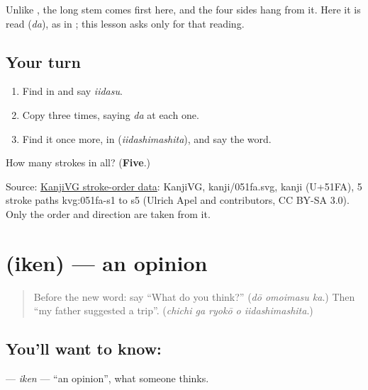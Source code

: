 Unlike \textbf{}, the long stem comes first here, and the four sides hang from it. Here it is read \textbf{} (\emph{da}), as in \textbf{}; this lesson asks only for that reading.

\subsection*{Your turn}
\begin{enumerate}
\raggedright
  \item Find \textbf{} in \textbf{} and say \emph{iidasu}.
  \item Copy \textbf{} three times, saying \emph{da} at each one.
  \item Find it once more, in \textbf{} (\emph{iidashimashita}), and say the word.
\end{enumerate}

\begin{tcolorbox}[breakable,colback=teal!4,colframe=teal!35!black,title={Before you move on}]
How many strokes in all? (\textbf{Five}.)

Source: \href{https://github.com/KanjiVG/kanjivg/blob/master/kanji/051fa.svg}{KanjiVG stroke-order data}: KanjiVG, kanji/051fa.svg, kanji  (U+51FA), 5 stroke paths kvg:051fa-s1 to s5 (Ulrich Apel and contributors, CC BY-SA 3.0). Only the order and direction are taken from it.
\end{tcolorbox}
\section[\texorpdfstring{\ja{いけん} (iken)}{いけん (iken)}]{ (iken) — an opinion}

\label{lesson:JA-C254-iken}



\begin{quote}
Before the new word: say \textquotedblleft{}What do you think?\textquotedblright{} (\emph{dō omoimasu ka}.) Then \textquotedblleft{}my father suggested a trip\textquotedblright{}. (\emph{chichi ga ryokō o iidashimashita}.)
\end{quote}

\subsection*{You'll want to know: }
\textbf{} — \emph{iken} — \textquotedblleft{}an opinion\textquotedblright{}, what someone thinks.

